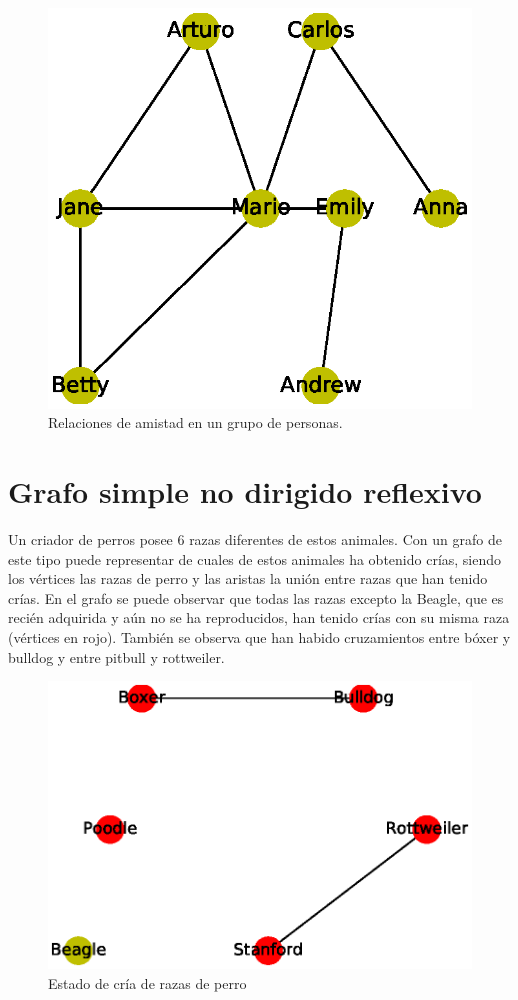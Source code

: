 \documentclass{article}
\begin{document}
\begin{figure}
  \includegraphics[width=.8\columnwidth]{2.eps}
  \caption{Relaciones de amistad en un grupo de personas.}
  \label{fig:2}
\end{figure}

\section{Grafo simple no dirigido reflexivo}

Un criador de perros posee 6 razas diferentes de estos animales. Con un grafo de este tipo puede representar de cuales de estos animales ha obtenido crías, siendo los vértices las razas de perro y las aristas la unión entre razas que han tenido crías.
En el grafo se puede observar que todas las razas excepto la Beagle, que es recién adquirida y aún no se ha reproducidos, han tenido crías con su misma raza (vértices en rojo). También se observa que han habido cruzamientos entre bóxer y bulldog y entre pitbull y rottweiler.



\begin{figure}
  \includegraphics[width=.8\columnwidth]{3.eps}
  \caption{Estado de cría de razas de perro}
  \label{fig:3}
\end{figure}
\end{document}
